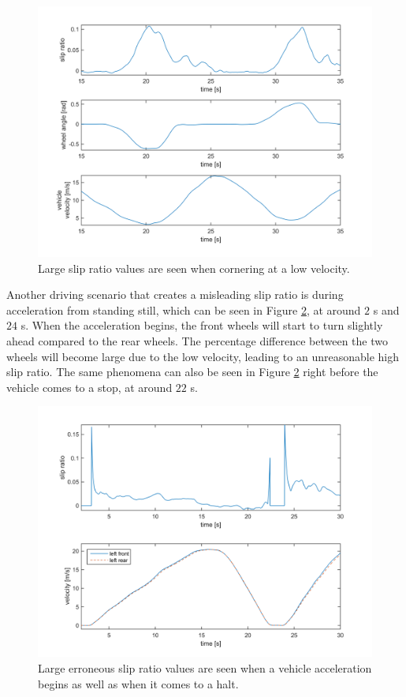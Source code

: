 \begin{figure}[h]
	\centering
	\includegraphics[width=1.0\textwidth]{Pictures/turning_slow_Vx}
	\caption {Large slip ratio values are seen when cornering at a low velocity.}
	\label{turning_slow_Vx}
\end{figure}

Another driving scenario that creates a misleading slip ratio is during acceleration from standing still, which can be seen in Figure \ref{slipratio_from_still}, at around $ 2 $ s and $ 24 $ s. When the acceleration begins, the front wheels will start to turn slightly ahead compared to the rear wheels. The percentage difference between the two wheels will become large due to the low velocity, leading to an unreasonable high slip ratio. The same phenomena can also be seen in Figure \ref{slipratio_from_still} right before the vehicle comes to a stop, at around $ 22 $ s. 

\begin{figure}[h]
	\centering
	\includegraphics[width=1.0\textwidth]{Pictures/slipratio_from_still}
	\caption {Large erroneous slip ratio values are seen when a vehicle acceleration begins as well as when it comes to a halt.}
	\label{slipratio_from_still}
\end{figure}

